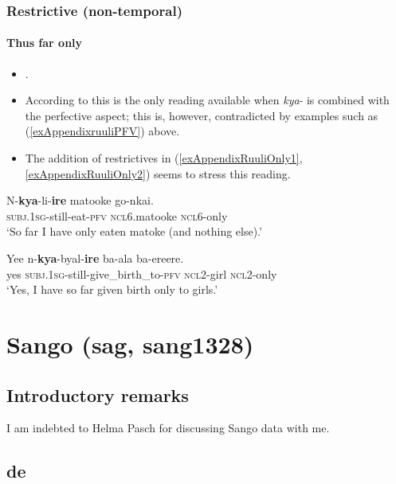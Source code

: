 \subsubsection{Restrictive (non-temporal)}
\paragraph{Thus far only}
\label{appendixRuuliRestrictive}
\begin{itemize}
	\item \textcite{MolochievaEtAl2021}.
	\item According to \textcite[87]{MolochievaEtAl2021} this is the only reading available when \mbox{\textit{kya}-} is combined with the perfective aspect; this is, however, contradicted by examples such as (\ref{exAppendixruuliPFV}) above.
	\item The addition of restrictives in (\ref{exAppendixRuuliOnly1}, \ref{exAppendixRuuliOnly2}) seems to stress this reading.
\end{itemize}
\begin{exe}

	\ex	\label{exAppendixRuuliOnly1}
	\gll N-\textbf{kya}-li-\textbf{ire}		matooke		go-nkai.\\
	\textsc{subj}.1\textsc{sg}-still-eat-\textsc{pfv} \textsc{ncl}6.matooke \textsc{ncl}6-only\\
	\glt \lq So far I have only eaten matoke (and nothing else).\rq{ }\parencite[87]{MolochievaEtAl2021}

	\ex	\label{exAppendixRuuliOnly2}	
		\gll Yee	n-\textbf{kya}-byal-\textbf{ire} ba-ala 	ba-ereere.\\
	yes	\textsc{subj}.1\textsc{sg}-still-give\_birth\_to-\textsc{pfv}	\textsc{ncl}2-girl \textsc{ncl}2-only\\
	\glt \lq Yes, I have so far given birth only to girls.\rq{ }\parencite[87]{MolochievaEtAl2021}
\end{exe}

\section{Sango (sag, sang1328)}\label{appendixSango}
\subsection{Introductory remarks}
I am indebted to Helma Pasch for discussing Sango data with me.

\subsection{de}
